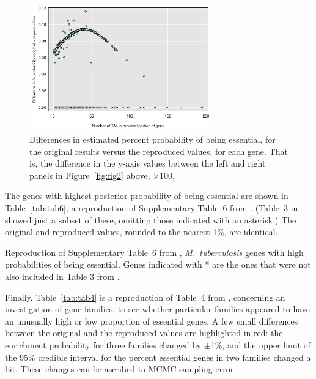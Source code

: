 \begin{figure}
\centering
\includegraphics[width=0.7\textwidth]{../reproduction/Figs/fig2_diff.pdf}

\caption{Differences in estimated percent probability of being
essential, for the original results versus the reproduced values, for
each gene. That is, the difference in the y-axis values between the
left and right panels in Figure~\ref{fig:fig2} above,
$\times$100, \label{fig:fig2diff}}
\end{figure}


The genes with highest posterior probability of being essential are
shown in Table~\ref{tab:tab6}, a reproduction of Supplementary Table~6
from \citet{lamichhane2003}.
(Table~3 in \citet{lamichhane2003} showed just a subset of
these, omitting those indicated with an asterisk.) The original and
reproduced values, rounded to the nearest 1\%, are identical.

\begin{table}
\caption{Reproduction of Supplementary Table~6 from \citet{lamichhane2003},
\emph{M.\ tuberculosis\/} genes with high probabilities of being
essential. Genes indicated with * are the ones that were not also
included in Table 3 from \citet{lamichhane2003}.\label{tab:tab6}}

\centering

\end{table}

Finally, Table~\ref{tab:tab4} is a reproduction of Table~4
from \citet{lamichhane2003}, concerning an investigation of gene families,
to see whether particular families appeared to have an unusually high
or low proportion of essential genes. A few small differences between
the original and the reproduced values are highlighted in red: the
enrichment probability for three families changed by $\pm$1\%,
and the upper limit of the 95\% credible interval for the percent
essential genes in two families changed a bit. These changes can be
ascribed to MCMC sampling error.

